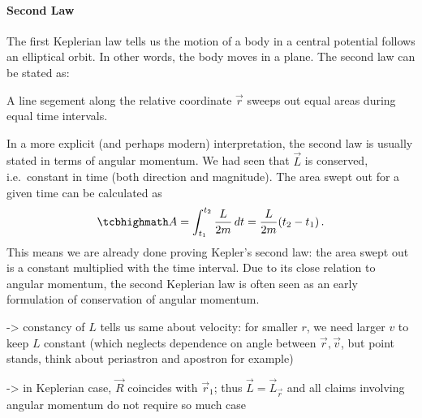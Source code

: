 \documentclass[../class_mech_main.tex]{subfiles}
\begin{document}
			\paragraph{Second Law}
The first Keplerian law tells us the motion of a body in a central potential follows an elliptical orbit. In other words, the body moves in a plane. The second law can be stated as:

\begin{center}
	A line segement along the relative coordinate $\vec{r}$ sweeps out equal areas during equal time intervals.
\end{center}


In a more explicit (and perhaps modern) interpretation, the second law is usually stated in terms of angular momentum. We had seen that $\vec{L}$ is conserved, i.e.~constant in time (both direction and magnitude). The area swept out for a given time can be calculated as
\begin{equation}
	\eqbox{
		A = \int_{t_1}^{t_2} \frac{L}{2m} \, dt = \frac{L}{2m} (t_2 - t_1)
	} \, .
\end{equation}
This means we are already done proving Kepler's second law: the area swept out is a constant multiplied with the time interval. Due to its close relation to angular momentum, the second Keplerian law is often seen as an early formulation of conservation of angular momentum.




-> constancy of $L$ tells us same about velocity: for smaller $r$, we need larger $v$ to keep $L$ constant (which neglects dependence on angle between $\vec{r}, \vec{v}$, but point stands, think about periastron and apostron for example)


-> in Keplerian case, $\vec{R}$ coincides with $\vec{r}_1$; thus $\vec{L} = \vec{L}_{\vec{r}}$ and all claims involving angular momentum do not require so much case 
\end{document}

